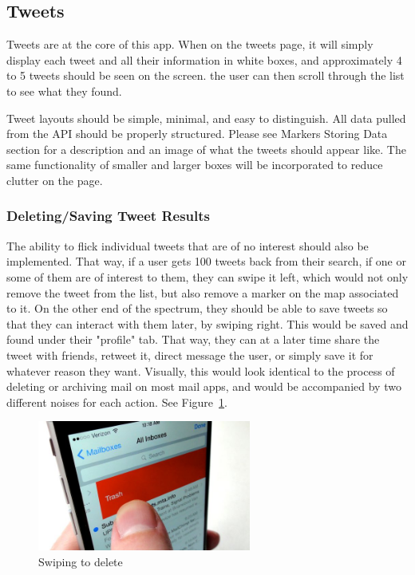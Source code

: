 \documentclass[11pt]{article}
\begin{document}
\subsection{Tweets}
Tweets are at the core of this app. When on the tweets page, it will simply display each tweet and all their information in white boxes, and approximately 4 to 5 tweets should be seen on the screen. the user can then scroll through the list to see what they found.

Tweet layouts should be simple, minimal, and easy to distinguish. All data pulled from the API should be properly structured. Please see Markers Storing Data section for a description and an image of what the tweets should appear like. The same functionality of smaller and larger boxes will be incorporated to reduce clutter on the page.


\subsubsection{Deleting/Saving Tweet Results}
The ability to flick individual tweets that are of no interest should also be implemented. That way, if a user gets 100 tweets back from their search, if one or some of them are of interest to them, they can swipe it left, which would not only remove the tweet from the list, but also remove a marker on the map associated to it. On the other end of the spectrum, they should be able to save tweets so that they can interact with them later, by swiping right. This would be saved and found under their "profile" tab. That way, they can at a later time share the tweet with friends, retweet it, direct message the user, or simply save it for whatever reason they want. Visually, this would look identical to the process of deleting or archiving mail on most mail apps, and would be accompanied by two different noises for each action. See Figure~\ref{fig:swipeDelete}.

\begin{figure}[H]
    \centering
    \includegraphics[width=7cm]{swipeDelete}
    \caption{Swiping to delete}
    \label{fig:swipeDelete}
\end{figure}
\end{document}
